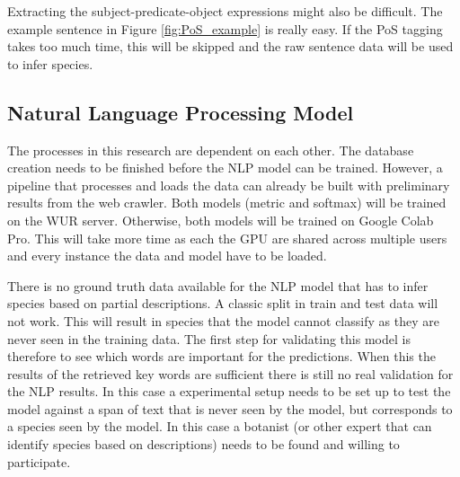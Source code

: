 \documentclass[a4paper, 12pt, oneside]{book} %
\begin{document}
Extracting the subject-predicate-object expressions might also be difficult. 
The example sentence in Figure \ref{fig:PoS_example} is really easy.
If the PoS tagging takes too much time, this will be skipped and the raw sentence data will be used to infer species.


\subsection{Natural Language Processing Model}
The processes in this research are dependent on each other.
The database creation needs to be finished before the NLP model can be trained.
However, a pipeline that processes and loads the data can already be built with preliminary results from the web crawler.
Both models (metric and softmax) will be trained on the WUR server.
Otherwise, both models will be trained on Google Colab Pro.
This will take more time as each the GPU are shared across multiple users and every instance the data  and model have to be loaded.



There is no ground truth data available for the NLP model that has to infer species based on partial descriptions.
A classic split in train and test data will not work. 
This will result in species that the model cannot classify as they are never seen in the training data.
The first step for validating this model is therefore to see which words are important for the predictions.
When this the results of the retrieved key words are sufficient there is still no real validation for the NLP results.
In this case a experimental setup needs to be set up to test the model against a span of text that is never seen by the model, but corresponds to a species seen by the model.
In this case a botanist (or other expert that can identify species based on descriptions) needs to be found and willing to participate.

\printbibliography
\end{document}
